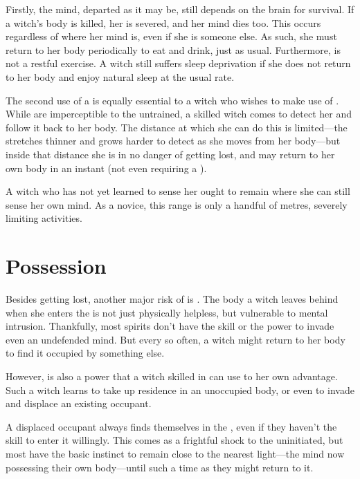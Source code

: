 Firstly, the mind, departed as it may be, still depends on the brain for survival.
If a witch's body is killed, her {\lifeline} is severed, and her mind dies too.
This occurs regardless of where her mind is, even if she is {\possessing} someone else.
As such, she must return to her body periodically to eat and drink, just as usual.
Furthermore,  is not a restful exercise.
A witch still suffers sleep deprivation if she does not return to her body and enjoy natural sleep at the usual rate.

The second use of a {\lifeline} is equally essential to a witch who wishes to make use of .
While {\lifelines} are imperceptible to the untrained, a skilled witch comes to detect her {\lifeline} and follow it back to her body.
The distance at which she can do this is limited---the {\lifeline} stretches thinner and grows harder to detect as she moves from her body---but inside that distance she is in no danger of getting lost, and may return to her own body in an instant (not even requiring a {\action}).

A witch who has not yet learned to sense her {\lifeline} ought to remain where she can still sense her own mind.
As a novice, this range is only a handful of metres, severely limiting activities.

\section{Possession}

Besides getting lost, another major risk of  is {\possession}.
The body a witch leaves behind when she enters the {\mentalrealm} is not just physically helpless, but vulnerable to mental intrusion.
Thankfully, most spirits don't have the skill or the power to invade even an undefended mind.
But every so often, a witch might return to her body to find it occupied by something else.

However, {\possession} is also a power that a witch skilled in  can use to her own advantage.
Such a witch learns to take up residence in an unoccupied body, or even to invade and displace an existing occupant.

A displaced occupant always finds themselves in the {\mentalrealm}, even if they haven't the skill to enter it willingly.
This comes as a frightful shock to the uninitiated, but most have the basic instinct to remain close to the nearest light---the mind now possessing their own body---until such a time as they might return to it.

